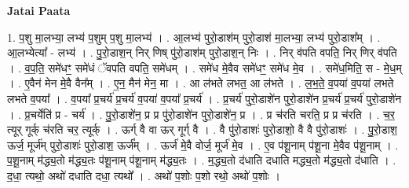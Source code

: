 \documentclass[17pt]{extarticle}
\begin{document}
\textbf{Jatai Paata} \newline

1. प॒शु मा॒लभ्या॒ लभ्य॑ प॒शुम् प॒शु मा॒लभ्य॑ । . आ॒लभ्य॑ पुरो॒डाश॑म् पुरो॒डाश॑ मा॒लभ्या॒ लभ्य॑ पुरो॒डाश᳚म् । . आ॒लभ्येत्या᳚ - लभ्य॑ । . पु॒रो॒डाश॒न् निर् णिष् पु॑रो॒डाश॑म् पुरो॒डाश॒न् निः । . निर् व॑पति वपति॒ निर् णिर् व॑पति । . व॒प॒ति॒ समे॑धꣳ॒॒ समे॑धं ॅवपति वपति॒ समे॑धम् । . समे॑ध मे॒वैव समे॑धꣳ॒॒ समे॑ध मे॒व । . समे॑ध॒मिति॒ स - मे॒ध॒म् । . ए॒वैन॑ मेन मे॒वै वैन᳚म् । . ए॒न॒ मैन॑ मेन॒ मा । . आ ल॑भते लभत॒ आ ल॑भते । . ल॒भ॒ते॒ व॒पया॑ व॒पया॑ लभते लभते व॒पया᳚ । . व॒पया᳚ प्र॒चर्य॑ प्र॒चर्य॑ व॒पया॑ व॒पया᳚ प्र॒चर्य॑ । . प्र॒चर्य॑ पुरो॒डाशे॑न पुरो॒डाशे॑न प्र॒चर्य॑ प्र॒चर्य॑ पुरो॒डाशे॑न । . प्र॒चर्येति॑ प्र - चर्य॑ । . पु॒रो॒डाशे॑न॒ प्र प्र पु॑रो॒डाशे॑न पुरो॒डाशे॑न॒ प्र । . प्र च॑रति चरति॒ प्र प्र च॑रति । . च॒र॒ त्यूर् गूर्क् च॑रति चर॒ त्यूर्क् । . ऊर्ग् वै वा ऊर् गूर्ग् वै । . वै पु॑रो॒डाशः॑ पुरो॒डाशो॒ वै वै पु॑रो॒डाशः॑ । . पु॒रो॒डाश॒ ऊर्ज॒ मूर्ज॑म् पुरो॒डाशः॑ पुरो॒डाश॒ ऊर्ज᳚म् । . ऊर्ज॑ मे॒वै वोर्ज॒ मूर्ज॑ मे॒व । . ए॒व प॑शू॒नाम् प॑शू॒ना मे॒वैव प॑शू॒नाम् । . प॒शू॒नाम् म॑द्ध्य॒तो म॑द्ध्य॒तः प॑शू॒नाम् प॑शू॒नाम् म॑द्ध्य॒तः । . म॒द्ध्य॒तो द॑धाति दधाति मद्ध्य॒तो म॑द्ध्य॒तो द॑धाति । . द॒धा॒ त्यथो॒ अथो॑ दधाति दधा॒ त्यथो᳚ । . अथो॑ प॒शोः प॒शो रथो॒ अथो॑ प॒शोः । \newline
\end{document}
